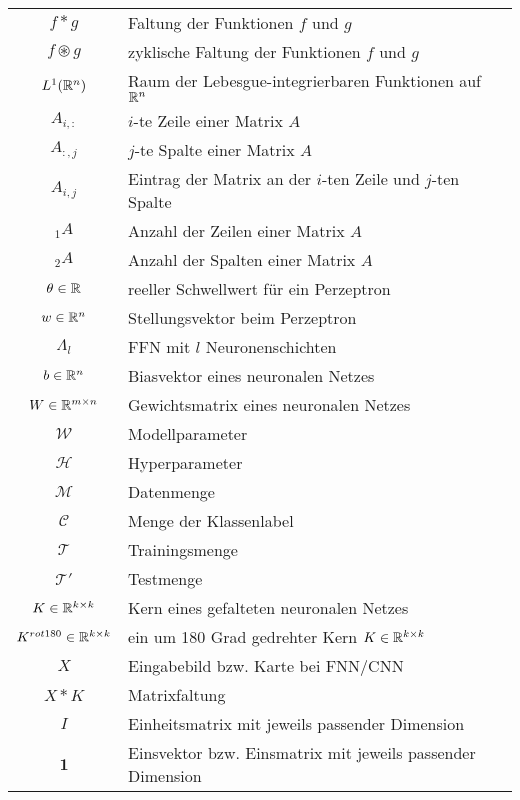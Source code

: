 \begin{tabular}{cp{}}
    $f \ast g$ & Faltung der Funktionen $f$ und $g$\\
    $f \circledast g$ & zyklische Faltung der Funktionen $f$ und $g$ \\
    $L^1(\mathbb{R}^n)$ & Raum der Lebesgue-integrierbaren Funktionen auf $\mathbb{R}^n$ \\
    $A_{i,:}$ & $i$-te Zeile einer Matrix $A$ \\
    $A_{:,j}$ & $j$-te Spalte einer Matrix $A$ \\
    $A_{i,j}$ & Eintrag der Matrix an der $i$-ten Zeile und $j$-ten Spalte \\
    ${}_1 A$ & Anzahl der Zeilen einer Matrix $A$ \\
    ${}_2 A$ & Anzahl der Spalten einer Matrix $A$ \\
    $ \theta \in \mathbb{R}$ & reeller Schwellwert für ein Perzeptron\\
    $ w \in \mathbb{R}^n$ & Stellungsvektor beim Perzeptron \\
    $\Lambda_l$ & FFN mit $l$ Neuronenschichten \\
    $ b \in \mathbb{R}^n$ &Biasvektor eines neuronalen Netzes\\
    $W \in \mathbb{R}^{m \times n}$ &Gewichtsmatrix eines neuronalen Netzes \\
    $\mathcal{W}$ & Modellparameter \\
    $\mathcal{H}$ & Hyperparameter \\
    $\mathcal{M}$ & Datenmenge \\
    $\mathcal{C}$ & Menge der Klassenlabel \\
    $\mathcal{T}$ & Trainingsmenge \\
    $\mathcal{T}'$ & Testmenge \\
    $K \in \mathbb{R}^{k \times k}$ & Kern eines gefalteten neuronalen Netzes \\
    $K^{rot180} \in \mathbb{R}^{k \times k}$ & ein um 180 Grad gedrehter Kern $K \in \mathbb{R}^{k \times k}$ \\
    $X$ & Eingabebild bzw. Karte bei FNN/CNN \\
    $X \ast K$ & Matrixfaltung \\
    $I$ & Einheitsmatrix mit jeweils passender Dimension \\
    $\mathbf{1}$ &Einsvektor bzw. Einsmatrix mit jeweils passender Dimension \\

\end{tabular}
